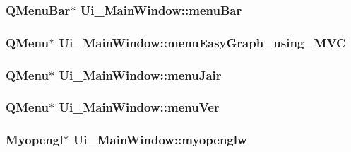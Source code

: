 \subsubsection[{\texorpdfstring{menu\+Bar}{menuBar}}]{\setlength{\rightskip}{0pt plus 5cm}Q\+Menu\+Bar$\ast$ Ui\+\_\+\+Main\+Window\+::menu\+Bar}\hypertarget{class_ui___main_window_a2be1c24ec9adfca18e1dcc951931457f}{}\label{class_ui___main_window_a2be1c24ec9adfca18e1dcc951931457f}
\subsubsection[{\texorpdfstring{menu\+Easy\+Graph\+\_\+using\+\_\+\+M\+VC}{menuEasyGraph_using_MVC}}]{\setlength{\rightskip}{0pt plus 5cm}Q\+Menu$\ast$ Ui\+\_\+\+Main\+Window\+::menu\+Easy\+Graph\+\_\+using\+\_\+\+M\+VC}\hypertarget{class_ui___main_window_aeba4f6b68139c1d14ec1bc0402e19de6}{}\label{class_ui___main_window_aeba4f6b68139c1d14ec1bc0402e19de6}
\subsubsection[{\texorpdfstring{menu\+Jair}{menuJair}}]{\setlength{\rightskip}{0pt plus 5cm}Q\+Menu$\ast$ Ui\+\_\+\+Main\+Window\+::menu\+Jair}\hypertarget{class_ui___main_window_afeada2d4fa7acbb4d7cedc3ac8989bc3}{}\label{class_ui___main_window_afeada2d4fa7acbb4d7cedc3ac8989bc3}
\subsubsection[{\texorpdfstring{menu\+Ver}{menuVer}}]{\setlength{\rightskip}{0pt plus 5cm}Q\+Menu$\ast$ Ui\+\_\+\+Main\+Window\+::menu\+Ver}\hypertarget{class_ui___main_window_ac1b869bd0185526c8830ec2de49917b1}{}\label{class_ui___main_window_ac1b869bd0185526c8830ec2de49917b1}
\subsubsection[{\texorpdfstring{myopenglw}{myopenglw}}]{\setlength{\rightskip}{0pt plus 5cm}Myopengl$\ast$ Ui\+\_\+\+Main\+Window\+::myopenglw}\hypertarget{class_ui___main_window_a3d00510ae8482f745dd08b1dbea610ea}{}\label{class_ui___main_window_a3d00510ae8482f745dd08b1dbea610ea}
